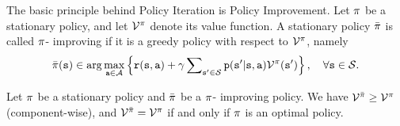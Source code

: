 The basic principle behind Policy Iteration is Policy Improvement.
Let $\pi$ be a stationary policy, and let $\mathcal{V}_{}^\pi $
denote its value function. A stationary policy $\bar {\pi} $ is
called $\pi$- improving if it is a greedy policy with respect to
${\mathcal{V}^\pi }$, namely
\[\bar {\pi} ({\tt s}) \in \arg {\max _{{\tt a}\in \mathcal{A}}}\left\{ {{\tt r}({\tt s},{\tt a}) + \gamma \sum\nolimits_{{\tt s}' \in \mathcal{S}} {{\tt p}({\tt s}'|{\tt s},{\tt a}){\mathcal{V}^\pi }({\tt s}')} } \right\}, \quad \forall {\tt s} \in \mathcal{S}.\]

\begin{lemma}
Let $\pi$ be a stationary policy and $\bar{\pi}$ be a
$\pi$- improving policy.
%
We have ${\mathcal{V}^{\bar {\pi} }} \ge {\mathcal{V}^\pi}$
(component-wise), and ${\mathcal{V}^{\bar {\pi} }} = {\mathcal{V}^\pi }$
if and only if $\pi $ is an optimal policy.
\end{lemma}

